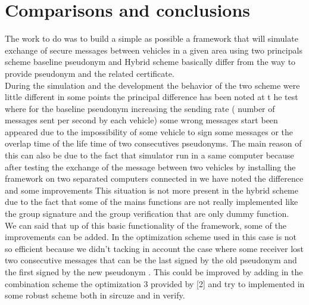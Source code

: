 \section{Comparisons and conclusions}
The work to do was to build a simple as possible a framework that will simulate exchange of secure messages between vehicles in a given area using two principals scheme baseline pseudonym and Hybrid scheme  basically differ  from the way to provide pseudonym  and the related certificate.\\
During the simulation and the development  the behavior of the two scheme were  little different in some points the principal difference has been noted at t he test where for the baseline  pseudonym increasing the sending rate ( number of messages sent per  second by each vehicle) some wrong messages start been appeared due to the impossibility of some vehicle to sign some messages or the overlap time of the life time of two consecutives pseudonyms. The main reason of this can also be due to the fact that simulator run in a same computer because after testing the exchange of the message between two vehicles by installing the framework on two separated computers connected in we have noted the difference and some improvements
This situation is not more present in the hybrid scheme due to the fact that some of the mains functions are not really implemented like the group signature and the group verification that are only dummy function.\\
We can said that up of this basic functionality of the framework, some of the improvements can be added.  In the optimization scheme used in this case is not so efficient because we didn't tacking in account the case where some receiver lost two consecutive messages that can be the last signed by the old pseudonym and the first signed by the  new pseudonym . This could be improved by adding in the combination scheme the optimization 3 provided by [2] and try to implemented in some robust scheme both in sircuze and in verify.\\